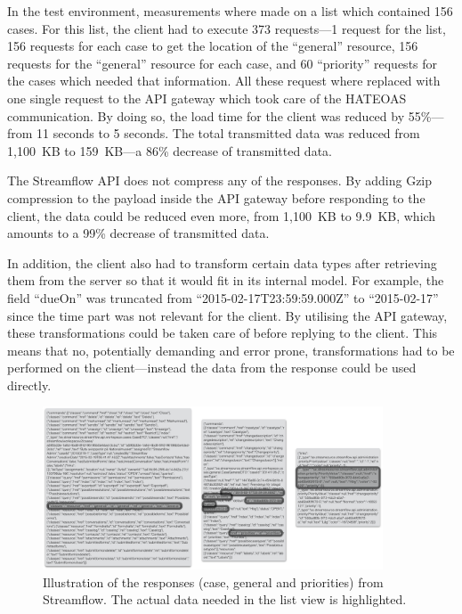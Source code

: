 \documentclass{cslthse-msc}
\begin{document}
In the test environment, measurements where made on a list which contained 156 cases. For this list, the client had to execute 373 requests---1 request for the list, 156 requests for each case to get the location of the \enquote{general} resource, 156 requests for the \enquote{general} resource for each case, and 60 \enquote{priority} requests for the cases which needed that information. All these request where replaced with one single request to the API gateway which took care of the HATEOAS communication. By doing so, the load time for the client was reduced by 55\%---from 11 seconds to 5 seconds. The total transmitted data was reduced from 1,100~KB to 159~KB---a 86\% decrease of transmitted data.

The Streamflow API does not compress any of the responses. By adding Gzip compression to the payload inside the API gateway before responding to the client, the data could be reduced even more, from 1,100~KB to 9.9~KB, which amounts to a 99\% decrease of transmitted data.

In addition, the client also had to transform certain data types after retrieving them from the server so that it would fit in its internal model. For example, the field \enquote{dueOn} was truncated from \enquote{2015-02-17T23:59:59.000Z} to \enquote{2015-02-17} since the time part was not relevant for the client. By utilising the API gateway, these transformations could be taken care of before replying to the client. This means that no, potentially demanding and error prone, transformations had to be performed on the client---instead the data from the response could be used directly.

\begin{figure}[H]
  \centering
    \begin{center}
      \includegraphics[width=0.9\textwidth]{images/streamflow_response.png}
    \end{center}
  \caption{Illustration of the responses (case, general and priorities) from Streamflow. The actual data needed in the list view is highlighted.}
\end{figure}
\end{document}
